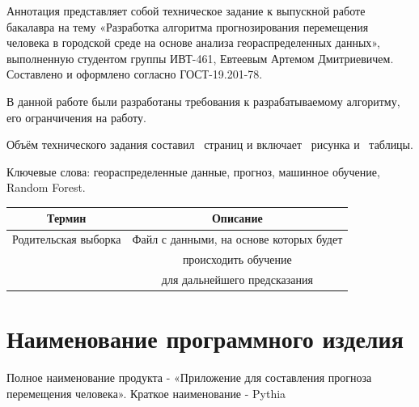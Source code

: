 \documentclass[a4paper,english]{G2-105}
\begin{document}
\VSTUMakeCenteredTOC
{}
	\par Аннотация представляет собой техническое задание к выпускной работе бакалавра на тему «Разработка алгоритма прогнозирования перемещения человека в 				городской среде на основе анализа геораспределенных данных», выполненную студентом группы ИВТ-461, Евтеевым Артемом Дмитриевичем. Составлено и оформлено 			согласно ГОСТ-19.201-78. 
	\par В данной работе были разработаны требования к разрабатываемому алгоритму, его огранчичения на работу.
	\par Объём технического задания составил \totalpages~страниц и включает \totalfigures~рисунка и \totaltables~таблицы. 
	\par Ключевые слова: геораспределенные данные, прогноз, машинное обучение, Random Forest.
\VSTUInitializeTZ
\tableofcontents
\newpage

	\begin{longtable}{|c|c|}
		\hline
		Термин	 		&	Описание \\ \hline \endhead
		Родительская выборка	&	Файл с данными, на основе которых будет\\
						&	происходить обучение\\
						&         для дальнейшего предсказания \\ \hline		
	\end{longtable}
\newpage

	\ttl
	\section{Наименование программного изделия}
		\par Полное наименование продукта -  «Приложение для составления прогноза перемещения человека». Краткое наименование - Pythia
\end{document}
